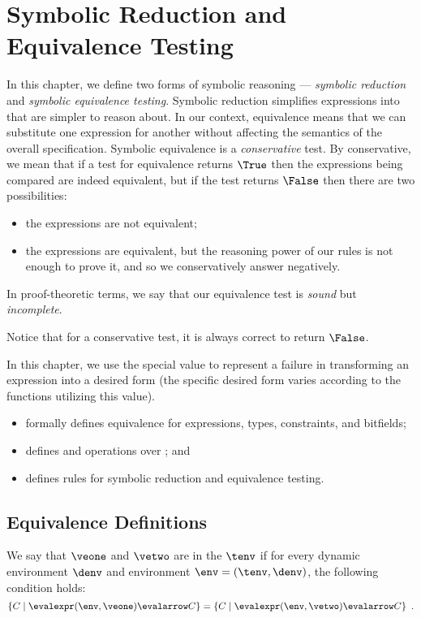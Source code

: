 \chapter{Symbolic Reduction and Equivalence Testing\label{chap:SymbolicEquivalenceTesting}}

In this chapter, we define two forms of symbolic reasoning ---
\emph{symbolic reduction} and \emph{symbolic equivalence testing}.
Symbolic reduction simplifies expressions into \equivalentexprsterm{}
that are simpler to reason about.
In our context, equivalence means that we can substitute one expression for another without
affecting the semantics of the overall specification.
%
Symbolic equivalence is a \emph{conservative} test.
By conservative, we mean that if a test for equivalence returns $\True$ then the expressions
being compared are indeed equivalent, but if the test returns $\False$ then
there are two possibilities:
\begin{itemize}
  \item the expressions are not equivalent;
  \item the expressions are equivalent, but the reasoning power of our rules
  is not enough to prove it, and so we conservatively answer negatively.
\end{itemize}
In proof-theoretic terms, we say that our equivalence test is \emph{sound} but \emph{incomplete}.

Notice that for a conservative test, it is always correct to return $\False$.

In this chapter, we use the special value 
to represent a failure in transforming an expression into a desired form (the specific
desired form varies according to the functions utilizing this value).

\ChapterOutline
\begin{itemize}
  \item {} formally defines equivalence for expressions, types, constraints, and bitfields;
  \item {} defines \symbolicexpressionsterm{} and operations over \symbolicexpressionsterm{}; and
  \item {} defines rules for symbolic reduction and equivalence testing.
\end{itemize}

\section{Equivalence Definitions\label{sec:Equivalence Definitions}}
\begin{definition}
\hypertarget{def-equivalentexprsterm}{}
We say that $\veone$ and $\vetwo$ are \emph{\equivalentexprsterm{}} in the \staticenvironmentterm{} $\tenv$
if for every dynamic environment $\denv$
and environment $\env = (\tenv, \denv)$, the following condition holds:
\[
\{ C \;|\; \evalexpr(\env, \veone) \evalarrow C \} = \{ C \;|\; \evalexpr(\env, \vetwo) \evalarrow C \} \enspace.
\]
\end{definition}


